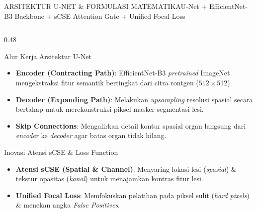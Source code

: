 \documentclass[aspectratio=169,11pt]{beamer}
\begin{document}
\begin{frame}{ARSITEKTUR U-NET \& FORMULASI MATEMATIKA}{U-Net + EfficientNet-B3 Backbone + sCSE Attention Gate + Unified Focal Loss}
\begin{columns}[T]
  \begin{column}{0.48\textwidth}
    \begin{block}{\footnotesize Alur Kerja Arsitektur U-Net}
      \begin{itemize}\tiny
        \item \textbf{Encoder (Contracting Path)}: EfficientNet-B3 \textit{pretrained} ImageNet mengekstraksi fitur semantik bertingkat dari citra rontgen ($512 \times 512$).
        \item \textbf{Decoder (Expanding Path)}: Melakukan \textit{upsampling} resolusi spasial secara bertahap untuk merekonstruksi piksel masker segmentasi lesi.
        \item \textbf{Skip Connections}: Mengalirkan detail kontur spasial organ langsung dari \textit{encoder} ke \textit{decoder} agar batas organ tidak hilang.
      \end{itemize}
    \end{block}

    \begin{block}{\footnotesize Inovasi Atensi sCSE \& Loss Function}
      \begin{itemize}\tiny
        \item \textbf{Atensi sCSE (Spatial \& Channel)}: Menyaring lokasi lesi (\textit{spasial}) \& tekstur opasitas (\textit{kanal}) untuk menajamkan kontras fitur lesi.
        \item \textbf{Unified Focal Loss}: Memfokuskan pelatihan pada piksel sulit (\textit{hard pixels}) \& menekan angka \textit{False Positives}.
      \end{itemize}
    \end{block}
  \end{column}
\end{columns}
\end{frame}
\end{document}
